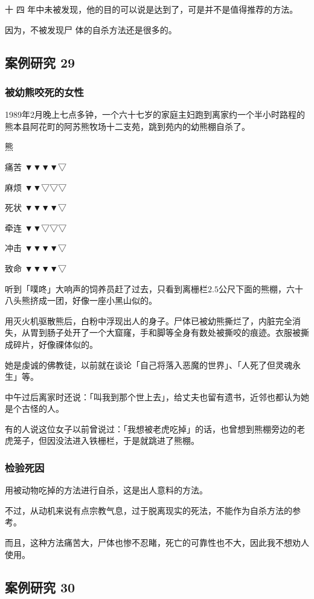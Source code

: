 \documentclass[UTF8]{ctexart}
\begin{document}
十 四 年中未被发现，他的目的可以说是达到了，可是并不是值得推荐的方法。

因为，不被发现尸 体的自杀方法还是很多的。


\subsection{案例研究 29}

\subsubsection*{被幼熊咬死的女性}

1989年2月晚上七点多钟，一个六十七岁的家庭主妇跑到离家约一个半小时路程的熊本县阿花町的阿苏熊牧场十二支苑，跳到苑内的幼熊棚自杀了。

熊

痛苦 ▼▼▼▼▽ 

麻烦 ▼▼▽▽▽ 

死状 ▼▼▼▼▽

牵连 ▼▼▽▽▽

冲击 ▼▼▼▼▽

致命 ▼▼▼▼▽

听到「噗咚」大响声的饲养员赶了过去，只看到离栅栏$2.5$公尺下面的熊棚，六十八头熊挤成一团，好像一座小黑山似的。

用灭火机驱散熊后，白粉中浮现出人的身子。尸体已被幼熊撕烂了，内脏完全消失，从胃到肠子处开了一个大窟窿，手和脚等全身有数处被撕咬的痕迹。衣服被撕成碎片，好像祼体似的。

她是虔诚的佛教徒，以前就在谈论「自己将落入恶魔的世界」、「人死了但灵魂永生」等。

中午过后离家时还说：「叫我到那个世上去」，给丈夫也留有遗书，近邻也都认为她是个古怪的人。
 
有的人说这位女子以前曾说过：「我想被老虎吃掉」的话，也曾想到熊棚旁边的老虎笼子，但因没法进入铁栅栏，于是就跳进了熊棚。

\subsubsection*{检验死因}

用被动物吃掉的方法进行自杀，这是出人意料的方法。

不过，从动机来说有点宗教气息，过于脱离现实的死法，不能作为自杀方法的参考。

而且，这种方法痛苦大，尸体也惨不忍睹，死亡的可靠性也不大，因此我不想劝人使用。



\subsection{案例研究 30}
\end{document}
